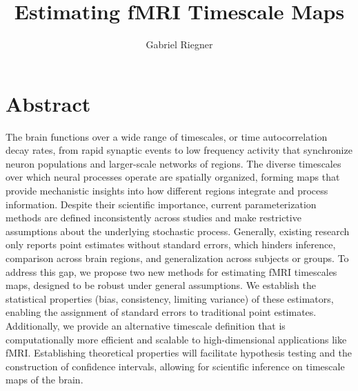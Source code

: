 \documentclass[9pt]{article}
\title{Estimating fMRI Timescale Maps}
\author{Gabriel Riegner}
\begin{document}
\maketitle

\section{Abstract}
The brain functions over a wide range of timescales, or time autocorrelation decay rates, from rapid synaptic events to low frequency activity that synchronize neuron populations and larger-scale networks of regions. The diverse timescales over which neural processes operate are spatially organized, forming maps that provide mechanistic insights into how different regions integrate and process information. Despite their scientific importance, current parameterization methods are defined inconsistently across studies and make restrictive assumptions about the underlying stochastic process. Generally, existing research only reports point estimates without standard errors, which hinders inference, comparison across brain regions, and generalization across subjects or groups. To address this gap, we propose two new methods for estimating fMRI timescales maps, designed to be robust under general assumptions. We establish the statistical properties (bias, consistency, limiting variance) of these estimators, enabling the assignment of standard errors to traditional point estimates. Additionally, we provide an alternative timescale definition that is computationally more efficient and scalable to high-dimensional applications like fMRI. Establishing theoretical properties will facilitate hypothesis testing and the construction of confidence intervals, allowing for scientific inference on timescale maps of the brain.








\printbibliography
\end{document}
